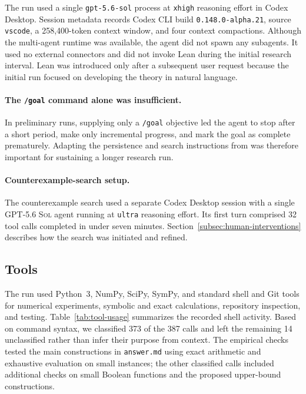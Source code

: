 \documentclass{article}
\theoremstyle{definition}
\theoremstyle{plain}
\newcommand{\gpt}{\textsc{GPT-5.6 Sol}\xspace}
\begin{document}
The run used a single \texttt{gpt-5.6-sol} process at \texttt{xhigh} reasoning effort in Codex Desktop. Session metadata records Codex CLI build \texttt{0.148.0-alpha.21}, source \texttt{vscode}, a 258,400-token context window, and four context compactions. Although the multi-agent runtime was available, the agent did not spawn any subagents. It used no external connectors and did not invoke Lean during the initial research interval. Lean was introduced only after a subsequent user request because the initial run focused on developing the theory in natural language.

\paragraph{The \texttt{/goal} command alone was insufficient.}
In preliminary runs, supplying only a \texttt{/goal} objective led the agent to stop after a short period, make only incremental progress, and mark the goal as complete prematurely. Adapting the persistence and search instructions from \citet{openai2026cdcprompt} was therefore important for sustaining a longer research run.

\paragraph{Counterexample-search setup.}
The counterexample search used a separate Codex Desktop session with a single \gpt agent running at \texttt{ultra} reasoning effort. Its first turn comprised 32 tool calls completed in under seven minutes. Section~\ref{subsec:human-interventions} describes how the search was initiated and refined.

\subsection{Tools}
\label{subsec:tools}


The run used Python~3, NumPy, SciPy, SymPy, and standard shell and Git tools for numerical experiments, symbolic and exact calculations, repository inspection, and testing. Table~\ref{tab:tool-usage} summarizes the recorded shell activity. Based on command syntax, we classified 373 of the 387 calls and left the remaining 14 unclassified rather than infer their purpose from context. The empirical checks tested the main constructions in \texttt{answer.md} using exact arithmetic and exhaustive evaluation on small instances; the other classified calls included additional checks on small Boolean functions and the proposed upper-bound constructions.
\end{document}
